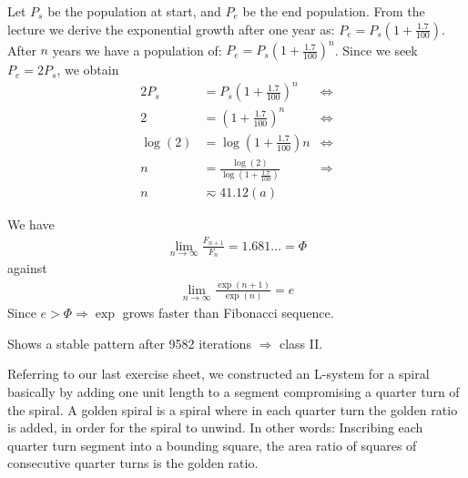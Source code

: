 \documentclass[10pt,a4paper,boxed]{hmcpset}
\begin{document}
\begin{problem}[Assignment 31]
\end{problem}
\begin{solution}
Let $P_s$ be the population at start, and $P_e$ be the end population.
From the lecture we derive the exponential growth after one year as: $P_e = P_s \left( 1 + \frac{1.7}{100} \right)$.
After $n$ years we have a population of: $P_e = P_s \left( 1 + \frac{1.7}{100} \right)^n$. Since we seek $P_e = 2 P_s$, we obtain
\begin{align*}
	2 P_s & = P_s \left( 1 + \frac{1.7}{100} \right)^n & \Leftrightarrow \\
	2 & = \left( 1 + \frac{1.7}{100} \right)^n & \Leftrightarrow \\
	\log(2) & = \log \left( 1 + \frac{1.7}{100} \right) n & \Leftrightarrow \\
	n & = \frac{\log(2)}{\log \left( 1 + \frac{1.7}{100} \right)} & \Rightarrow \\
	n & \eqsim 41.12 (a)
\end{align*}
\end{solution}

\begin{problem}[Assignment 32]
\end{problem}
\begin{solution}
We have
\begin{align*}
	\lim_{n \rightarrow \infty} \frac{F_{n+1}}{F_n} = 1.681\ldots = \Phi
\end{align*}
against
\begin{align*}
	\lim_{n \rightarrow \infty} \frac{\exp(n+1)}{\exp(n)} = e
\end{align*}
Since $e > \Phi \Rightarrow \exp$ grows faster than Fibonacci sequence.
\end{solution}

\begin{problem}[Assignment 33]
\end{problem}
\begin{solution}
Shows a stable pattern after 9582 iterations $\Rightarrow$ class II.
\end{solution}

\begin{problem}[Assignment 34]
\end{problem}
\begin{solution}
Referring to our last exercise sheet, we constructed an L-system for a spiral basically by adding one unit length to a segment compromising a quarter turn of the spiral. A golden spiral is a spiral where in each quarter turn the golden ratio is added, in order for the spiral to unwind. In other words: Inscribing each quarter turn segment into a bounding square, the area ratio of squares of consecutive quarter turns is the golden ratio.
\end{solution}
\end{document}
